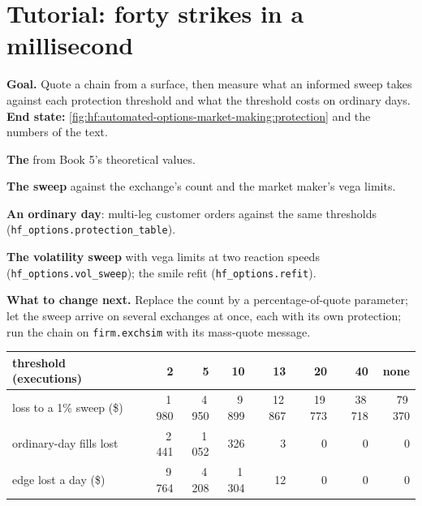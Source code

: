 \section{Tutorial: forty strikes in a millisecond}\label{tut:hf:automated-options-market-making:tut}

\begin{tutorial}
\textbf{Goal.} Quote a chain from a surface, then measure what an informed sweep takes against each protection threshold and what the threshold
costs on ordinary days. \textbf{End state:} \cref{fig:hf:automated-options-market-making:protection} and the numbers of the text.
\begin{tutsteps}
\item \textbf{The } from Book 5's theoretical values.
\label{lst:hf:automated-options-market-making:quote}
\item \textbf{The sweep} against the exchange's count and the market maker's vega limits.
\label{lst:hf:automated-options-market-making:sweep}
\item \textbf{An ordinary day}: multi-leg customer orders against the same thresholds (\texttt{hf\_options.protection\_table}).
\item \textbf{The volatility sweep} with vega limits at two reaction speeds (\texttt{hf\_options.vol\_sweep}); the smile refit
(\texttt{hf\_options.refit}).
\end{tutsteps}
\textbf{What to change next.} Replace the count by a percentage-of-quote parameter; let the sweep arrive on several exchanges at once, each with
its own protection; run the chain on \texttt{firm.exchsim} with its mass-quote message.
\end{tutorial}

\begin{center}
\small
\begin{tabular}{@{}lrrrrrrr@{}}
\toprule
threshold (executions) & 2 & 5 & 10 & 13 & 20 & 40 & none\\
\midrule
loss to a 1\% sweep (\$) & 1\,980 & 4\,950 & 9\,899 & 12\,867 & 19\,773 & 38\,718 & 79\,370\\
ordinary-day fills lost & 2\,441 & 1\,052 & 326 & 3 & 0 & 0 & 0\\
edge lost a day (\$) & 9\,764 & 4\,208 & 1\,304 & 12 & 0 & 0 & 0\\
\bottomrule
\end{tabular}
\end{center}

